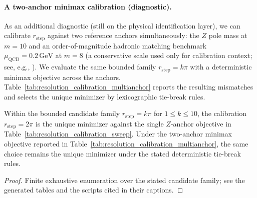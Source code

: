 \paragraph{A two-anchor minimax calibration (diagnostic).}
As an additional diagnostic (still on the physical identification layer), we can calibrate $r_{\mathrm{step}}$ against two reference anchors simultaneously: the $Z$ pole mass at $m=10$ and an order-of-magnitude hadronic matching benchmark $\mu_{\mathrm{QCD}}=0.2\,\mathrm{GeV}$ at $m=8$ (a conservative scale used only for calibration context; see, e.g., \cite{PDGRPP2024,Greensite2011Confinement}).
We evaluate the same bounded family $r_{\mathrm{step}}=k\pi$ with a deterministic minimax objective across the anchors.
Table~\ref{tab:resolution_calibration_multianchor} reports the resulting mismatches and selects the unique minimizer by lexicographic tie-break rules.

\begin{table}[t]
\centering
\scriptsize
\setlength{\tabcolsep}{6pt}
\renewcommand{\arraystretch}{1.15}
%
\caption{Two-anchor minimax calibration over the bounded family $r_{\mathrm{step}}=k\pi$ ($1\le k\le 10$), using $m_Z=91.1876\,\mathrm{GeV}$ and $\mu_{\mathrm{QCD}}=0.2\,\mathrm{GeV}$ as reference anchors at $m=10$ and $m=8$, respectively. Rows are reproduced by the deterministic script \texttt{scripts/exp\_resolution\_calibration\_multianchor.py}.}
\label{tab:resolution_calibration_multianchor}
\end{table}

\begin{proposition}[Bounded-complexity calibration selection of \texorpdfstring{$r_{\mathrm{step}}=2\pi$}{r\_step=2pi}]\label{prop:r_step_2pi}
Within the bounded candidate family $r_{\mathrm{step}}=k\pi$ for $1\le k\le 10$, the calibration $r_{\mathrm{step}}=2\pi$ is the unique minimizer against the single $Z$-anchor objective in Table~\ref{tab:resolution_calibration_sweep}.
Under the two-anchor minimax objective reported in Table~\ref{tab:resolution_calibration_multianchor}, the same choice remains the unique minimizer under the stated deterministic tie-break rules.
\end{proposition}
\begin{proof}
Finite exhaustive enumeration over the stated candidate family; see the generated tables and the scripts cited in their captions.
\end{proof}

